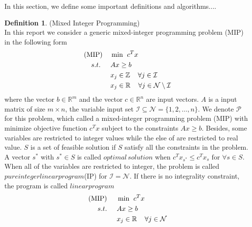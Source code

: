 \documentclass[11pt]{article}
\theoremstyle{definition}
\newtheorem{definition}{Definition}[section] %
\begin{document}
In this section, we define some important definitions and algorithms....
\begin{definition}
(Mixed Integer Programming)\\
In this report we consider a generic mixed-integer programming problem (MIP) in the following form
	\begin{align*}
	\text{(MIP)} \hspace{4mm} &\min \hspace{1.5mm}c^Tx \\
	s.t.\hspace{5mm} &Ax \geq b \\
	&x_j \in \mathbb{Z} \hspace{4mm} \forall j \in \mathcal{I}\\
	&x_j \in \mathbb{R} \hspace{4mm} \forall j \in \mathcal{N} \setminus \mathcal{I}\\
	\end{align*}
where the vector $b \in \mathbb{R}^m$ and the vector $c \in \mathbb{R}^n$ are input vectors.   $A$ is a input matrix of size $m \times n$, the variable input set $\mathcal{I} \subseteq \mathcal{N} = \lbrace 1,2,\dots,n\rbrace$. We denote $\mathcal{P}$ for this problem, which called a mixed-integer programming problem (MIP) with minimize objective function $c^Tx$ subject to the constraints $Ax \geq b$. Besides, some variables are restricted to integer values while the else of are restricted to real value. $S$ is a set of feasible solution if $S$ satisfy all the constraints in the problem. A vector $s^*$ with $s^* \in  S $ is called $optimal \, solution$ when $c^Tx_{s^*} \leq c^Tx_{s} \text{ for } \forall s \in S$.
When all of the variables are restricted to integer, the problem is called $pure integer linear program$(IP) for $\mathcal{I} = \mathcal{N}$. If there is no  integrality constraint, the program is called $linear program$
	\begin{align*}
	\text{(MIP)} \hspace{5mm} &\min \hspace{1.5mm}c^Tx \\
	s.t.\hspace{5mm} &Ax \geq b \\
	&x_j \in \mathbb{R} \hspace{4mm} \forall j \in \mathcal{N} \\
	\end{align*}

\label{def_MIP}
\end{definition}
\end{document}
